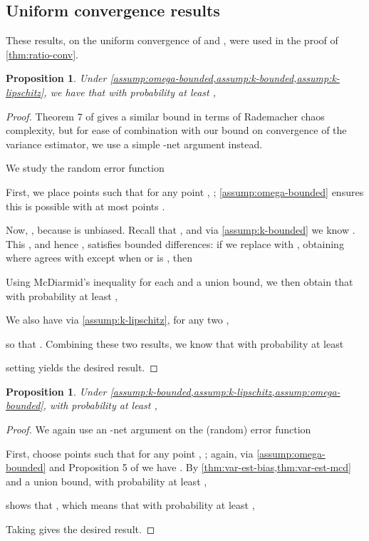 \documentclass{article}
\newtheorem{prop}[theorem]{Proposition}  \crefname{prop}{Proposition}{Propositions}
\begin{document}
\subsection{Uniform convergence results} \label{sec:proof:unif-conv}
These results, on the uniform convergence of  and ,
were used in the proof of \cref{thm:ratio-conv}.

\begin{prop}
\label{thm:mmd-conv}
Under \cref{assump:omega-bounded,assump:k-bounded,assump:k-lipschitz},
we have that with probability at least ,

\end{prop}
\begin{proof}
Theorem 7 of \citet{sriperumbudur2009choice} gives a similar bound in terms of Rademacher chaos complexity, but for ease of combination with our bound on convergence of the variance estimator, we use a simple -net argument instead.

We study the random error function


First, we place  points 
such that for any point ,
;
\cref{assump:omega-bounded} ensures this is possible with at most  points
\citep[Proposition 5]{cucker:foundations}.

Now, , because  is unbiased.
Recall that ,
and via \cref{assump:k-bounded} we know .
This , and hence , satisfies bounded differences:
if we replace  with ,
obtaining 
where  agrees with  except when  or  is ,
then

Using McDiarmid's inequality for each  and a union bound,
we then obtain that with probability at least ,


We also have via \cref{assump:k-lipschitz}, for any two ,

so that .
Combining these two results,
we know that with probability at least 

setting  yields the desired result.
\end{proof}







\begin{prop} \label{thm:var-conv}
Under \cref{assump:k-bounded,assump:k-lipschitz,assump:omega-bounded},
with probability at least ,

\end{prop}
\begin{proof}
We again use an -net argument
on the (random) error function

First, choose  points 
such that for any point ,
;
again,
via \cref{assump:omega-bounded} and Proposition 5 of \citet{cucker:foundations}
we have .
By \cref{thm:var-est-bias,thm:var-est-mcd} and a union bound,
with probability at least ,

 shows that ,
which means that with probability at least ,

Taking  gives the desired result.
\end{proof}
\end{document}
